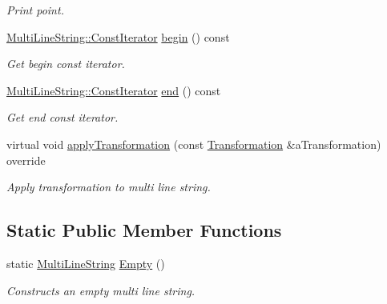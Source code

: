 \begin{DoxyCompactItemize}
\begin{DoxyCompactList}\small\item\em Print point. \end{DoxyCompactList}\item 
\hyperlink{classostk_1_1math_1_1geom_1_1d2_1_1objects_1_1_multi_line_string_a43dc9419e5743d8a920141ba4fa10c5f}{Multi\+Line\+String\+::\+Const\+Iterator} \hyperlink{classostk_1_1math_1_1geom_1_1d2_1_1objects_1_1_multi_line_string_a9789bc63ef669a8f625da8f617a605a6}{begin} () const
\begin{DoxyCompactList}\small\item\em Get begin const iterator. \end{DoxyCompactList}\item 
\hyperlink{classostk_1_1math_1_1geom_1_1d2_1_1objects_1_1_multi_line_string_a43dc9419e5743d8a920141ba4fa10c5f}{Multi\+Line\+String\+::\+Const\+Iterator} \hyperlink{classostk_1_1math_1_1geom_1_1d2_1_1objects_1_1_multi_line_string_ac2e17ceb1a3f276273c5276a5d0a4ea2}{end} () const
\begin{DoxyCompactList}\small\item\em Get end const iterator. \end{DoxyCompactList}\item 
virtual void \hyperlink{classostk_1_1math_1_1geom_1_1d2_1_1objects_1_1_multi_line_string_ada5fe5a183b6628831867b416901459e}{apply\+Transformation} (const \hyperlink{classostk_1_1math_1_1geom_1_1d2_1_1_transformation}{Transformation} \&a\+Transformation) override
\begin{DoxyCompactList}\small\item\em Apply transformation to multi line string. \end{DoxyCompactList}\end{DoxyCompactItemize}
\subsection*{Static Public Member Functions}
\begin{DoxyCompactItemize}
\item 
static \hyperlink{classostk_1_1math_1_1geom_1_1d2_1_1objects_1_1_multi_line_string}{Multi\+Line\+String} \hyperlink{classostk_1_1math_1_1geom_1_1d2_1_1objects_1_1_multi_line_string_a1f0815649194309c185ac3020b9d80a2}{Empty} ()
\begin{DoxyCompactList}\small\item\em Constructs an empty multi line string. \end{DoxyCompactList}\end{DoxyCompactItemize}


